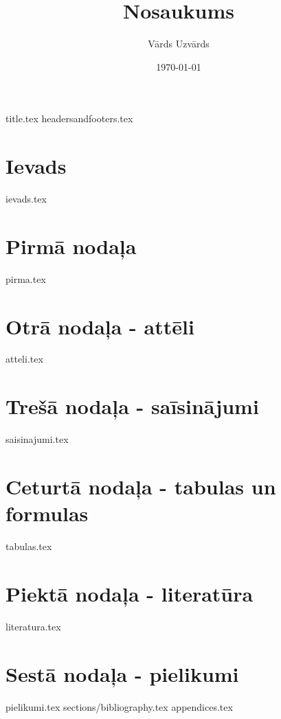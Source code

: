 \documentclass[a4paper,12pt]{article}
\author{Vārds Uzvārds}
\title{Nosaukums}
\date{\today}
\begin{document}
{title.tex}                  %
{headersandfooters.tex}      %
\printglossaries	                    %
\setcounter{page}{2} 
\pagebreak
\tableofcontents
\thispagestyle{fancy}                   %
\pagebreak
\section*{Ievads}
{ievads.tex}
\pagebreak
\section{Pirmā nodaļa}
{pirma.tex}
\pagebreak
\section{Otrā nodaļa - attēli}
{atteli.tex}
\pagebreak
\section{Trešā nodaļa - saīsinājumi}
{saisinajumi.tex}
\pagebreak
\section{Ceturtā nodaļa - tabulas un formulas}
{tabulas.tex}
\pagebreak
\section{Piektā nodaļa - literatūra}
{literatura.tex}
\pagebreak
\section{Sestā nodaļa - pielikumi}
{pielikumi.tex}
\pagebreak
{sections/bibliography.tex}
\pagebreak
{appendices.tex}
\end{document}
